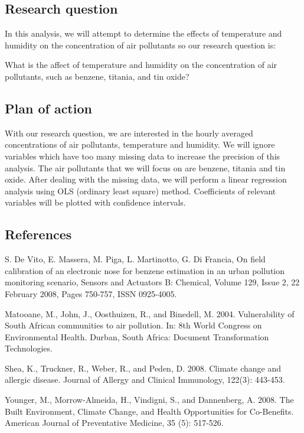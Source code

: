\documentclass[]{article}
\begin{document}
\hypertarget{research-question}{%
\subsection{Research question}\label{research-question}}

In this analysis, we will attempt to determine the effects of
temperature and humidity on the concentration of air pollutants so our
research question is:

What is the affect of temperature and humidity on the concentration of
air pollutants, such as benzene, titania, and tin oxide?

\hypertarget{plan-of-action}{%
\subsection{Plan of action}\label{plan-of-action}}

With our research question, we are interested in the hourly averaged
concentrations of air pollutants, temperature and humidity. We will
ignore variables which have too many missing data to increase the
precision of this analysis. The air pollutants that we will focus on are
benzene, titania and tin oxide. After dealing with the missing data, we
will perform a linear regression analysis using OLS (ordinary least
square) method. Coefficients of relevant variables will be plotted with
confidence intervals.

\hypertarget{references}{%
\subsection{References}\label{references}}

S. De Vito, E. Massera, M. Piga, L. Martinotto, G. Di Francia, On field
calibration of an electronic nose for benzene estimation in an urban
pollution monitoring scenario, Sensors and Actuators B: Chemical, Volume
129, Issue 2, 22 February 2008, Pages 750-757, ISSN 0925-4005.

Matooane, M., John, J., Oosthuizen, R., and Binedell, M. 2004.
Vulnerability of South African communities to air pollution. In: 8th
World Congress on Environmental Health. Durban, South Africa: Document
Transformation Technologies.

Shea, K., Truckner, R., Weber, R., and Peden, D. 2008. Climate change
and allergic disease. Journal of Allergy and Clinical Immunology,
122(3): 443-453.

Younger, M., Morrow-Almeida, H., Vindigni, S., and Dannenberg, A. 2008.
The Built Environment, Climate Change, and Health Opportunities for
Co-Benefits. American Journal of Preventative Medicine, 35 (5): 517-526.
\end{document}
